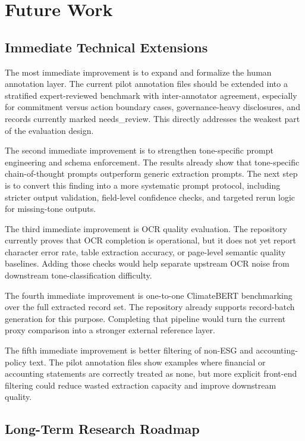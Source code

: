 \section{Future Work}
\subsection{Immediate Technical Extensions}

The most immediate improvement is to expand and formalize the human annotation layer. The current pilot annotation files should be extended into a stratified expert-reviewed benchmark with inter-annotator agreement, especially for commitment versus action boundary cases, governance-heavy disclosures, and records currently marked needs\_review. This directly addresses the weakest part of the evaluation design.

The second immediate improvement is to strengthen tone-specific prompt engineering and schema enforcement. The results already show that tone-specific chain-of-thought prompts outperform generic extraction prompts. The next step is to convert this finding into a more systematic prompt protocol, including stricter output validation, field-level confidence checks, and targeted rerun logic for missing-tone outputs.

The third immediate improvement is OCR quality evaluation. The repository currently proves that OCR completion is operational, but it does not yet report character error rate, table extraction accuracy, or page-level semantic quality baselines. Adding those checks would help separate upstream OCR noise from downstream tone-classification difficulty.

The fourth immediate improvement is one-to-one ClimateBERT benchmarking over the full extracted record set. The repository already supports record-batch generation for this purpose. Completing that pipeline would turn the current proxy comparison into a stronger external reference layer.

The fifth immediate improvement is better filtering of non-ESG and accounting-policy text. The pilot annotation files show examples where financial or accounting statements are correctly treated as none, but more explicit front-end filtering could reduce wasted extraction capacity and improve downstream quality.

\subsection{Long-Term Research Roadmap}

